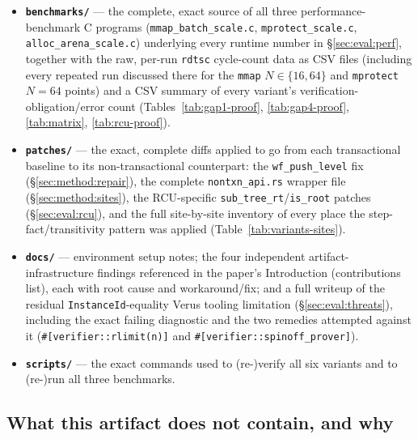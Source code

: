 \documentclass[10pt]{article}
\newcommand{\vfn}[1]{\texttt{#1}}
\begin{document}
\begin{itemize}
  \item \textbf{\vfn{benchmarks/}} --- the complete, exact source of
    all three performance-benchmark C programs
    (\vfn{mmap\_batch\_scale.c}, \vfn{mprotect\_scale.c},
    \vfn{alloc\_arena\_scale.c}) underlying every runtime number in
    \S\ref{sec:eval:perf}, together with the raw, per-run \texttt{rdtsc}
    cycle-count data as CSV files (including every repeated run
    discussed there for the \vfn{mmap} $N{\in}\{16,64\}$ and
    \vfn{mprotect} $N{=}64$ points) and a CSV summary of every
    variant's verification-obligation/error count
    (Tables~\ref{tab:gap1-proof}, \ref{tab:gap4-proof},
    \ref{tab:matrix}, \ref{tab:rcu-proof}).
  \item \textbf{\vfn{patches/}} --- the exact, complete diffs applied
    to go from each transactional baseline to its non-transactional
    counterpart: the \vfn{wf\_push\_level} fix
    (\S\ref{sec:method:repair}), the complete \vfn{nontxn\_api.rs}
    wrapper file (\S\ref{sec:method:sites}), the RCU-specific
    \vfn{sub\_tree\_rt}/\vfn{is\_root} patches
    (\S\ref{sec:eval:rcu}), and the full site-by-site inventory of
    every place the step-fact/transitivity pattern was applied
    (Table~\ref{tab:variants-sites}).
  \item \textbf{\vfn{docs/}} --- environment setup notes; the four
    independent artifact-infrastructure findings referenced in the
    paper's Introduction (contributions list), each with root cause
    and workaround/fix; and a full writeup of the residual
    \vfn{InstanceId}-equality Verus tooling limitation
    (\S\ref{sec:eval:threats}), including the exact failing diagnostic
    and the two remedies attempted against it
    (\texttt{\#[verifier::rlimit(n)]} and
    \texttt{\#[verifier::spinoff\_prover]}).
  \item \textbf{\vfn{scripts/}} --- the exact commands used to
    (re-)verify all six variants and to (re-)run all three benchmarks.
\end{itemize}

\subsection{What this artifact does not contain, and why}
\end{document}
